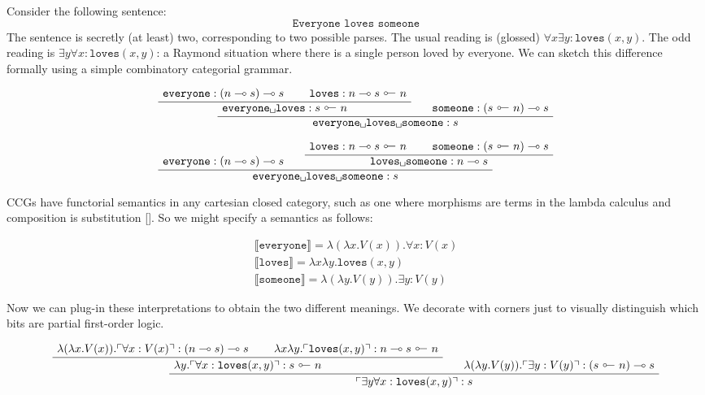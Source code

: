 \begin{example}
Consider the following sentence:
\[\texttt{Everyone loves someone}\]
The sentence is secretly (at least) two, corresponding to two possible parses. The usual reading is (glossed) $\forall x \exists y : \texttt{loves}(x,y)$. The odd reading is $\exists y \forall x : \texttt{loves}(x,y)$: a Raymond situation where there is a single person loved by everyone. We can sketch this difference formally using a simple combinatory categorial grammar.

\[
\AxiomC{$\texttt{everyone} : (n \multimap s) \multimap s$}
\AxiomC{$\texttt{loves} : n \multimap s \ \rotatebox[origin=c]{180}{$\multimap$} \ n$}
\BinaryInfC{$\texttt{everyone\textvisiblespace loves} : s \ \rotatebox[origin=c]{180}{$\multimap$} \ n$}
\AxiomC{$\texttt{someone} : (s \ \rotatebox[origin=c]{180}{$\multimap$} \ n) \multimap s$}
\BinaryInfC{$\texttt{everyone\textvisiblespace loves\textvisiblespace someone} : s$}
\DisplayProof
\]

\[
\AxiomC{$\texttt{everyone} : (n \multimap s) \multimap s$}
\AxiomC{$\texttt{loves} : n \multimap s \ \rotatebox[origin=c]{180}{$\multimap$} \ n$}
\AxiomC{$\texttt{someone} : (s \ \rotatebox[origin=c]{180}{$\multimap$} \ n) \multimap s$}
\BinaryInfC{$\texttt{loves\textvisiblespace someone} : n \multimap s$}
\BinaryInfC{$\texttt{everyone\textvisiblespace loves\textvisiblespace someone} : s$}
\DisplayProof
\]

CCGs have functorial semantics in any cartesian closed category, such as one where morphisms are terms in the lambda calculus and composition is substitution []. So we might specify a semantics as follows:

\begin{align}
\llbracket \texttt{everyone} \rrbracket = \lambda (\lambda x . V(x)) . \forall x : V(x) \\
\llbracket \texttt{loves} \rrbracket = \lambda x \lambda y . \texttt{loves}(x,y) \\
\llbracket \texttt{someone} \rrbracket = \lambda (\lambda y . V(y)) . \exists y : V(y)
\end{align}

Now we can plug-in these interpretations to obtain the two different meanings. We decorate with corners just to visually distinguish which bits are partial first-order logic.

\[
\AxiomC{$\lambda (\lambda x . V(x)) . \ulcorner \forall x : V(x) \urcorner : (n \multimap s) \multimap s$}
\AxiomC{$\lambda x \lambda y . \ulcorner \texttt{loves}(x,y) \urcorner : n \multimap s \ \rotatebox[origin=c]{180}{$\multimap$} \ n$}
\BinaryInfC{$ \lambda y . \ulcorner \forall x : \texttt{loves}(x,y) \urcorner : s \ \rotatebox[origin=c]{180}{$\multimap$} \ n$}
\AxiomC{$\lambda (\lambda y . V(y)) . \ulcorner \exists y : V(y) \urcorner : (s \ \rotatebox[origin=c]{180}{$\multimap$} \ n) \multimap s$}
\BinaryInfC{$ \ulcorner \exists y \forall x : \texttt{loves}(x,y) \urcorner : s$}
\DisplayProof
\]


\end{example}
